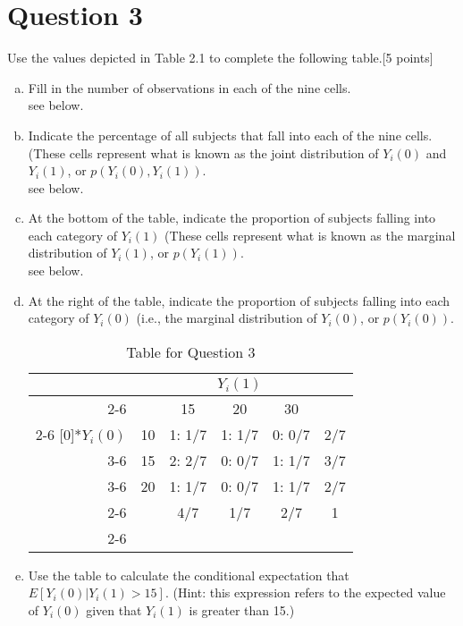 \documentclass[11pt,notitlepage]{article}\usepackage[]{graphicx}\usepackage[]{color}
\begin{document}
\section*{Question 3}
Use the values depicted in Table 2.1 to complete the following table.[5 points]
\begin{enumerate}[a)]
\item Fill in the number of observations in each of the nine cells. \\
see below.
\item Indicate the percentage of all subjects that fall into each of the nine cells. (These cells represent what is known as the joint distribution of $Y_{i}(0)$ and $Y_{i}(1)$, or $p(Y_{i}(0), Y_{i}(1))$.\\
see below.
\item At the bottom of the table, indicate the proportion of subjects falling into each category of $Y_{i}(1)$ (These cells represent what is known as the marginal distribution of $Y_{i}(1)$, or $p(Y_{i}(1))$. \\
see below.
\item At the right of the table, indicate the proportion of subjects falling into each category of $Y_{i}(0)$ (i.e., the marginal distribution of $Y_{i}(0)$, or $p(Y_{i}(0))$. \\

\begin{table}[H]
  \centering
  \caption{Table for Question 3}
    \begin{tabular}{r|r|c|c|c|c|}
     \multicolumn{1}{c}{}       &      \multicolumn{1}{c}{}    & \multicolumn{3}{c}{$Y_{i}(1)$}  &    \multicolumn{1}{c}{} \\ \cline{2-6}
     &        &  \multicolumn{1}{c}{15}    &  \multicolumn{1}{c}{20}    &    30    &   \\ \cline{2-6}
   \multirow{3}[0]{*}{$Y_{i}(0)$} & 10    & 1: 1/7   & 1: 1/7   & 0: 0/7     & 2/7 \\\cline{3-6}
     & 15    & 2: 2/7   & 0: 0/7     & 1: 1/7   & 3/7 \\ \cline{3-6}
     & 20    & 1: 1/7   & 0: 0/7     & 1: 1/7   & 2/7 \\ \cline{2-6}
          &       & 4/7   & 1/7   & 2/7   & 1 \\
\cline{2-6}
    \end{tabular}
\end{table}

\item Use the table to calculate the conditional expectation that $E[Y_{i}(0)|Y_{i}(1) > 15]$.  (Hint: this expression refers to the expected value of $Y_i (0)$ given that $Y_i (1)$ is greater than 15.) 


\end{enumerate}
\end{document}
